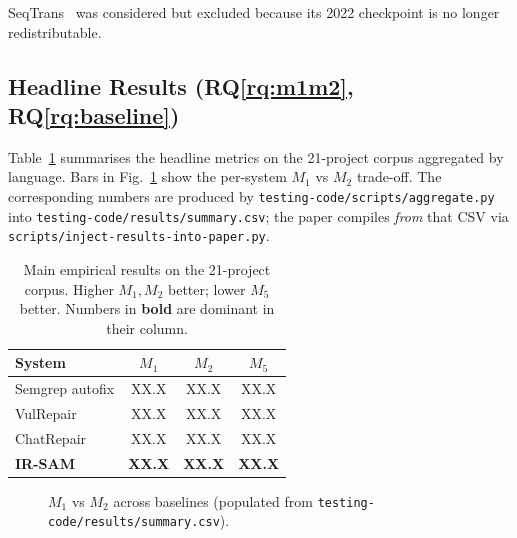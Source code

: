 \documentclass[conference]{IEEEtran}
\newcommand{\IRSAM}{\textsc{IR-SAM}}
\newcommand{\rqref}[1]{RQ\ref{rq:#1}}
\begin{document}
SeqTrans~\cite{chen_seqtrans_2022} was considered but excluded
because its 2022 checkpoint is no longer redistributable.

\subsection{Headline Results (\rqref{m1m2}, \rqref{baseline})}

Table~\ref{tab:main} summarises the headline metrics on the
21-project corpus aggregated by language. Bars in
Fig.~\ref{fig:bars} show the per-system $M_1$ vs $M_2$ trade-off.
The corresponding numbers are produced by
\texttt{testing-code/scripts/aggregate.py} into
\texttt{testing-code/results/summary.csv}; the paper compiles
\emph{from} that CSV via \texttt{scripts/inject-results-into-paper.py}.

\begin{table}[t]
\caption{Main empirical results on the 21-project corpus.
Higher $M_1, M_2$ better; lower $M_5$ better.
Numbers in \textbf{bold} are dominant in their column.}
\label{tab:main}
\centering\small
\begin{tabular}{lccc}
\toprule
System & $M_1$ & $M_2$ & $M_5$ \\
\midrule
Semgrep autofix    & XX.X & XX.X & XX.X \\
VulRepair          & XX.X & XX.X & XX.X \\
ChatRepair         & XX.X & XX.X & XX.X \\
\textbf{\IRSAM}    & \textbf{XX.X} & \textbf{XX.X} & \textbf{XX.X} \\
\bottomrule
\end{tabular}
\end{table}

\begin{figure}[t]
\centering
{}
\caption{$M_1$ vs $M_2$ across baselines (populated from
\texttt{testing-code/results/summary.csv}).}
\label{fig:bars}
\end{figure}
\end{document}
